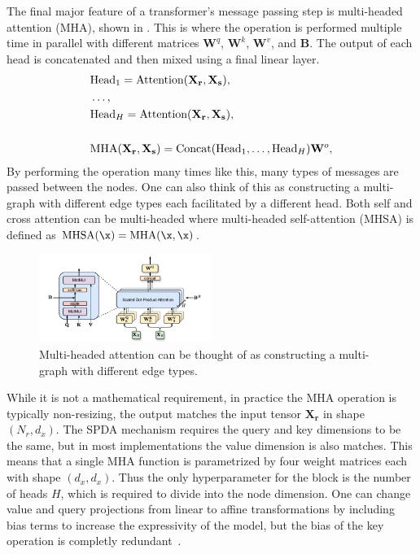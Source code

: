 The final major feature of a transformer's message passing step is multi-headed attention (MHA), shown in .
This is where the operation is performed multiple time in parallel with different matrices $\mathbf{W}^q$, $\mathbf{W}^k$, $\mathbf{W}^v$, and $\mathbf{B}$.
The output of each head is concatenated and then mixed using a final linear layer.
\begin{equation}
    \begin{aligned}
    & \text{Head}_1 = \text{Attention}(\mathbf{X_r}, \mathbf{X_s}), \\
    & \ldots, \\
    & \text{Head}_H = \text{Attention}(\mathbf{X_r}, \mathbf{X_s}), \\
    \vphantom{x} \\
    & \text{MHA}(\mathbf{X_r}, \mathbf{X_s}) = \text{Concat}(\text{Head}_1, \ldots, \text{Head}_H) \mathbf{W}^o,
    \end{aligned}
\end{equation}
By performing the operation many times like this, many types of messages are passed between the nodes.
One can also think of this as constructing a multi-graph with different edge types each facilitated by a different head.
Both self and cross attention can be multi-headed where multi-headed self-attention (MHSA) is defined as $\text{MHSA}(\x) = \text{MHA}(\x, \x)$.

\begin{figure}
    \centering
    \includegraphics[width=0.5\textwidth]{Figures/transformers/mha.pdf}
    \caption{Multi-headed attention can be thought of as constructing a multi-graph with different edge types.}
    \label{fig:mha}
\end{figure}

While it is not a mathematical requirement, in practice the MHA operation is typically non-resizing, the output matches the input tensor $\mathbf{X_r}$ in shape $(N_r, d_x)$.
The SPDA mechanism requires the query and key dimensions to be the same, but in most implementations the value dimension is also matches.
This means that a single MHA function is parametrized by four weight matrices each with shape $(d_x, d_x)$.
Thus the only hyperparameter for the block is the number of heads $H$, which is required to divide into the node dimension.
One can change value and query projections from linear to affine transformations by including bias terms to increase the expressivity of the model, but the bias of the key operation is completly redundant~.

